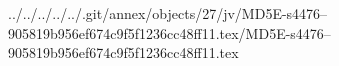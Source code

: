../../../../../.git/annex/objects/27/jv/MD5E-s4476--905819b956ef674c9f5f1236cc48ff11.tex/MD5E-s4476--905819b956ef674c9f5f1236cc48ff11.tex
